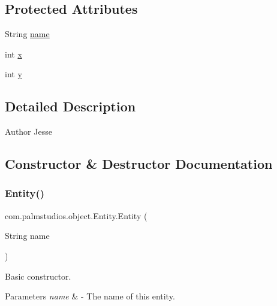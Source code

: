 \subsection*{Protected Attributes}
\begin{DoxyCompactItemize}
\item 
String \hyperlink{classcom_1_1palmstudios_1_1object_1_1_entity_ad1dd4b4b3fd94cdd50041ed527a15f06}{name}
\item 
int \hyperlink{classcom_1_1palmstudios_1_1object_1_1_entity_a6afb5022e6335acc944d420251f111fc}{x}
\item 
int \hyperlink{classcom_1_1palmstudios_1_1object_1_1_entity_a6bcadd557e5642f4ce95f220f3f7c4c7}{y}
\end{DoxyCompactItemize}


\subsection{Detailed Description}
\begin{DoxyAuthor}{Author}
Jesse 
\end{DoxyAuthor}


\subsection{Constructor \& Destructor Documentation}
\mbox{\label{classcom_1_1palmstudios_1_1object_1_1_entity_add92a93befa9a5d13d4ce83af5fb2404}} 
\subsubsection{\texorpdfstring{Entity()}{Entity()}\hspace{0.1cm}{\footnotesize\ttfamily [1/2]}}
{\footnotesize\ttfamily com.\+palmstudios.\+object.\+Entity.\+Entity (\begin{DoxyParamCaption}\item[{String}]{name }\end{DoxyParamCaption})}

Basic constructor.


\begin{DoxyParams}{Parameters}
{\em name} & -\/ The name of this entity. \\
\hline
\end{DoxyParams}
\mbox{\label{classcom_1_1palmstudios_1_1object_1_1_entity_ac20961b308971ff4da8054665126b9fd}} 
